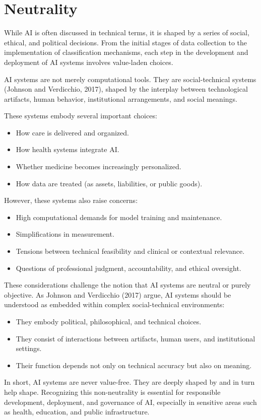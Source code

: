 \section{Neutrality}

While AI is often discussed in technical terms, it is shaped by a series of social, ethical, and political decisions. 
From the initial stages of data collection to the implementation of classification mechanisms, each step in the development and deployment of AI systems involves value-laden choices.

AI systems are not merely computational tools. 
They are social-technical systems (Johnson and Verdicchio, 2017), shaped by the interplay between technological artifacts, human behavior, institutional arrangements, and social meanings.

These systems embody several important choices:
\begin{itemize}
   \item How care is delivered and organized.
   \item How health systems integrate AI.
   \item Whether medicine becomes increasingly personalized.
   \item How data are treated (as assets, liabilities, or public goods).
\end{itemize}
\noindent However, these systems also raise concerns:
\begin{itemize}
    \item High computational demands for model training and maintenance.
    \item Simplifications in measurement.
    \item Tensions between technical feasibility and clinical or contextual relevance.
    \item Questions of professional judgment, accountability, and ethical oversight.
\end{itemize}

These considerations challenge the notion that AI systems are neutral or purely objective. 
As Johnson and Verdicchio (2017) argue, AI systems should be understood as embedded within complex social-technical environments:
\begin{itemize}
    \item They embody political, philosophical, and technical choices.
    \item They consist of interactions between artifacts, human users, and institutional settings.
    \item Their function depends not only on technical accuracy but also on meaning.
\end{itemize}
\noindent In short, AI systems are never value-free. 
They are deeply shaped by and in turn help shape. 
Recognizing this non-neutrality is essential for responsible development, deployment, and governance of AI, especially in sensitive areas such as health, education, and public infrastructure.